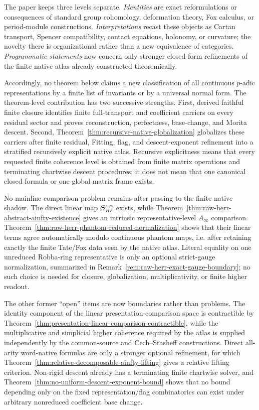 \documentclass[11pt]{article}
\theoremstyle{definition}
\begin{document}
The paper keeps three levels separate.  \emph{Identities} are exact reformulations or consequences of standard group cohomology, deformation theory, Fox calculus, or period-module constructions.  \emph{Interpretations} recast these objects as Cartan transport, Spencer compatibility, contact equations, holonomy, or curvature; the novelty there is organizational rather than a new equivalence of categories.  \emph{Programmatic statements} now concern only stronger closed-form refinements of the finite native atlas already constructed theoremically.

Accordingly, no theorem below claims a new classification of all continuous $p$-adic representations by a finite list of invariants or by a universal normal form.  The theorem-level contribution has two successive strengths.  First, derived faithful finite closure identifies finite full-transport and coefficient carriers on every residual sector and proves reconstruction, perfectness, base-change, and Morita descent.  Second, Theorem~\ref{thm:recursive-native-globalization} globalizes these carriers after finite residual, Fitting, flag, and descent-exponent refinement into a stratified recursively explicit native atlas.  Recursive explicitness means that every requested finite coherence level is obtained from finite matrix operations and terminating chartwise descent procedures; it does not mean that one canonical closed formula or one global matrix frame exists.

No mainline comparison problem remains after passing to the finite native shadow.  The direct linear map $\Theta_{HF}^{\mathrm{raw}}$ exists, while Theorem~\ref{thm:raw-herr-abstract-ainfty-existence} gives an intrinsic representative-level $A_\infty$ comparison.  Theorem~\ref{thm:raw-herr-phantom-reduced-normalization} shows that their linear terms agree automatically modulo continuous phantom maps, i.e. after retaining exactly the finite Tate/Fox data seen by the native atlas.  Literal equality on one unreduced Robba-ring representative is only an optional strict-gauge normalization, summarized in Remark~\ref{rem:raw-herr-exact-gauge-boundary}; no such choice is needed for closure, globalization, multiplicativity, or finite higher readout.

The other former ``open'' items are now boundaries rather than problems.  The identity component of the linear presentation-comparison space is contractible by Theorem~\ref{thm:presentation-linear-comparison-contractible}, while the multiplicative and simplicial higher coherence required by the atlas is supplied independently by the common-source and Cech--Stasheff constructions.  Direct all-arity word-native formulas are only a stronger optional refinement, for which Theorem~\ref{thm:relative-decomposable-ainfty-lifting} gives a relative lifting criterion.  Non-rigid descent already has a terminating finite chartwise solver, and Theorem~\ref{thm:no-uniform-descent-exponent-bound} shows that no bound depending only on the fixed representation/flag combinatorics can exist under arbitrary nonreduced coefficient base change.
\end{document}
